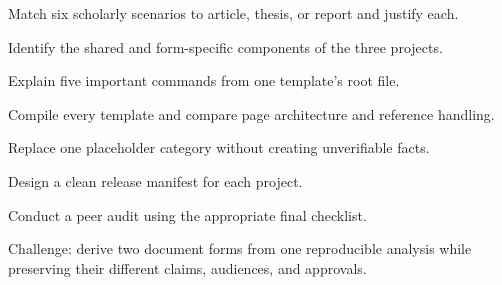 \chapterexercisestitle
\begin{chapterexercises}
  \item Match six scholarly scenarios to article, thesis, or report and justify each.
  \item Identify the shared and form-specific components of the three projects.
  \item Explain five important commands from one template's root file.
  \item Compile every template and compare page architecture and reference handling.
  \item Replace one placeholder category without creating unverifiable facts.
  \item Design a clean release manifest for each project.
  \item Conduct a peer audit using the appropriate final checklist.
  \item Challenge: derive two document forms from one reproducible analysis while
        preserving their different claims, audiences, and approvals.
\end{chapterexercises}
